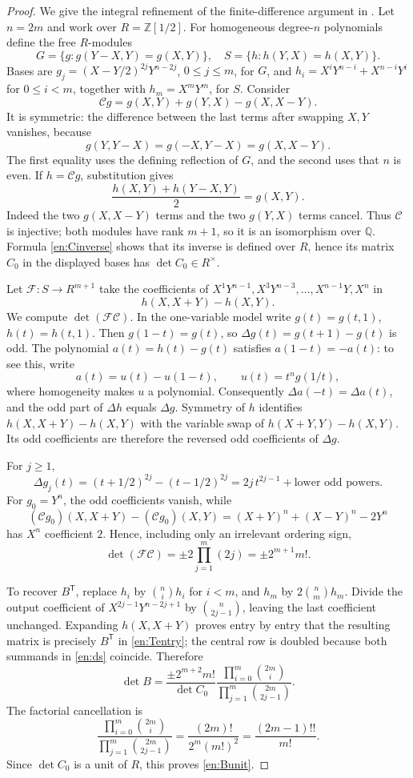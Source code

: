 \documentclass[12pt]{amsart}
\theoremstyle{definition}
\theoremstyle{remark}
\numberwithin{equation}{section}
\newcommand{\Z}{\mathbb{Z}}
\newcommand{\Q}{\mathbb{Q}}
\newcommand{\Rdy}{\Z[1/2]}
\theoremstyle{definition}
\theoremstyle{remark}
\begin{document}
\begin{proof}
We give the integral refinement of the finite-difference argument
in \cite[\S4, Proposition 3]{GKZ}. Let $n=2m$ and work over $R=\Rdy$.
For homogeneous degree-$n$ polynomials define the free $R$-modules
\[
 G=\{g:g(Y-X,Y)=g(X,Y)\},\quad
 S=\{h:h(Y,X)=h(X,Y)\}.
\]
Bases are
$g_j=(X-Y/2)^{2j}Y^{n-2j}$, $0\leq j\leq m$, for $G$, and
$h_i=X^iY^{n-i}+X^{n-i}Y^i$ for $0\leq i<m$, together with
$h_m=X^mY^m$, for $S$.
Consider
\[
 \mathcal Cg=g(X,Y)+g(Y,X)-g(X,X-Y).
\]
It is symmetric: the difference between the last terms after swapping
$X,Y$ vanishes, because
\[
 g(Y,Y-X)=g(-X,Y-X)=g(X,X-Y).
\]
The first equality uses the defining reflection of $G$, and the second
uses that $n$ is even. If $h=\mathcal Cg$, substitution gives
\begin{equation}\label{en:Cinverse}
 \frac{h(X,Y)+h(Y-X,Y)}2=g(X,Y).
\end{equation}
Indeed the two $g(X,X-Y)$ terms and the two $g(Y,X)$ terms cancel.
Thus $\mathcal C$ is injective; both modules have rank $m+1$, so it is an
isomorphism over $\Q$. Formula \eqref{en:Cinverse} shows that its inverse
is defined over $R$, hence its matrix $C_0$ in the displayed bases has
$\det C_0\in R^\times$.

Let $\mathcal F:S\to R^{m+1}$ take the coefficients of
$X^1Y^{n-1},X^3Y^{n-3},\ldots,X^{n-1}Y,X^n$ in
\[
 h(X,X+Y)-h(X,Y).
\]
We compute $\det(\mathcal F\mathcal C)$. In the one-variable model write
$g(t)=g(t,1)$, $h(t)=h(t,1)$. Then $g(1-t)=g(t)$, so
$\Delta g(t)=g(t+1)-g(t)$ is odd. The polynomial
$a(t)=h(t)-g(t)$ satisfies $a(1-t)=-a(t)$: to see this, write
\[
 a(t)=u(t)-u(1-t),\qquad u(t)=t^n g(1/t),
\]
where homogeneity makes $u$ a polynomial. Consequently
$\Delta a(-t)=\Delta a(t)$, and the odd part of $\Delta h$ equals
$\Delta g$. Symmetry of $h$ identifies
$h(X,X+Y)-h(X,Y)$ with the variable swap of
$h(X+Y,Y)-h(X,Y)$. Its odd coefficients are therefore the reversed
odd coefficients of $\Delta g$.

For $j\geq1$,
\[
 \Delta g_j(t)=(t+1/2)^{2j}-(t-1/2)^{2j}
              =2j\,t^{2j-1}+\text{lower odd powers}.
\]
For $g_0=Y^n$, the odd coefficients vanish, while
\[
 (\mathcal Cg_0)(X,X+Y)-(\mathcal Cg_0)(X,Y)
 =(X+Y)^n+(X-Y)^n-2Y^n
\]
has $X^n$ coefficient $2$. Hence, including only an irrelevant ordering
sign,
\[
 \det(\mathcal F\mathcal C)=\pm2\prod_{j=1}^m(2j)
                          =\pm2^{m+1}m!.
\]

To recover $B^\mathsf T$, replace $h_i$ by
$\binom ni h_i$ for $i<m$, and $h_m$ by
$2\binom nm h_m$. Divide the output coefficient of $X^{2j-1}Y^{n-2j+1}$
by $\binom n{2j-1}$, leaving the last coefficient unchanged. Expanding
$h(X,X+Y)$ proves entry by entry that the resulting matrix is precisely
$B^\mathsf T$ in \eqref{en:Tentry}; the central row is doubled because
both summands in \eqref{en:ds} coincide. Therefore
\[
 \det B=\frac{\pm2^{m+2}m!}{\det C_0}
       \frac{\prod_{i=0}^m\binom{2m}{i}}
            {\prod_{j=1}^m\binom{2m}{2j-1}}.
\]
The factorial cancellation is
\[
 \frac{\prod_{i=0}^m\binom{2m}{i}}
      {\prod_{j=1}^m\binom{2m}{2j-1}}
 =\frac{(2m)!}{2^m(m!)^2}
 =\frac{(2m-1)!!}{m!}.
\]
Since $\det C_0$ is a unit of $R$, this proves \eqref{en:Bunit}.
\end{proof}
\end{document}
